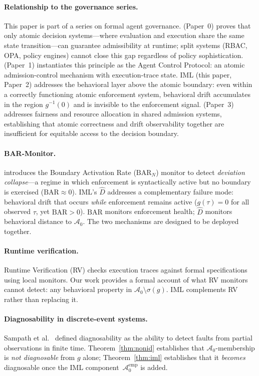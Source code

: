\documentclass[11pt]{article}
\newcommand{\Azero}{\mathcal{A}_0}
\newcommand{\Dhat}{\widehat{D}}
\newcommand{\sigg}{\sigma(g)}
\begin{document}
\paragraph{Relationship to the governance series.}
This paper is part of a series on formal agent governance.
\citet{fernandez2026a} (Paper~0) proves that only atomic decision
systems---where evaluation and execution share the same state
transition---can guarantee admissibility at runtime; split systems
(RBAC, OPA, policy engines) cannot close this gap regardless of policy
sophistication.
\citet{fernandez2026acp} (Paper~1) instantiates this principle as the
Agent Control Protocol: an atomic admission-control mechanism with
execution-trace state.
IML (this paper, Paper~2) addresses the behavioral layer above the atomic
boundary: even within a correctly functioning atomic enforcement system,
behavioral drift accumulates in the region $g^{-1}(0)$ and is invisible
to the enforcement signal.
\citet{fairgov26} (Paper~3) addresses fairness and resource allocation in
shared admission systems, establishing that atomic correctness and drift
observability together are insufficient for equitable access to the
decision boundary.

\paragraph{BAR-Monitor.}
\citet{fernandez2026acp} introduces the Boundary Activation Rate
($\mathrm{BAR}_N$) monitor to detect \emph{deviation collapse}---a regime
in which enforcement is syntactically active but no boundary is exercised
($\mathrm{BAR} \approx 0$).  IML's $\Dhat$ addresses a complementary failure
mode: behavioral drift that occurs \emph{while} enforcement remains active
($g(\tau) = 0$ for all observed $\tau$, yet $\mathrm{BAR} > 0$).
$\mathrm{BAR}$ monitors enforcement health; $\Dhat$ monitors behavioral
distance to $\Azero$.  The two mechanisms are designed to be deployed
together.

\paragraph{Runtime verification.}
Runtime Verification (RV) \cite{leucker2009brief,falcone2012runtime} checks
execution traces against formal specifications using local monitors.
Our work provides a formal account of what RV monitors cannot detect: any
behavioral property in $\Azero \setminus \sigg$.  IML complements RV rather
than replacing it.

\paragraph{Diagnosability in discrete-event systems.}
Sampath et al.\ \cite{sampath1995diagnosability} defined diagnosability as the
ability to detect faults from partial observations in finite time.
Theorem~\ref{thm:nonid} establishes that $\Azero$-membership is
\emph{not diagnosable} from $g$ alone; Theorem~\ref{thm:iml} establishes
that it \emph{becomes} diagnosable once the IML component~$\Azero^{\mathrm{emp}}$
is added.
\end{document}
